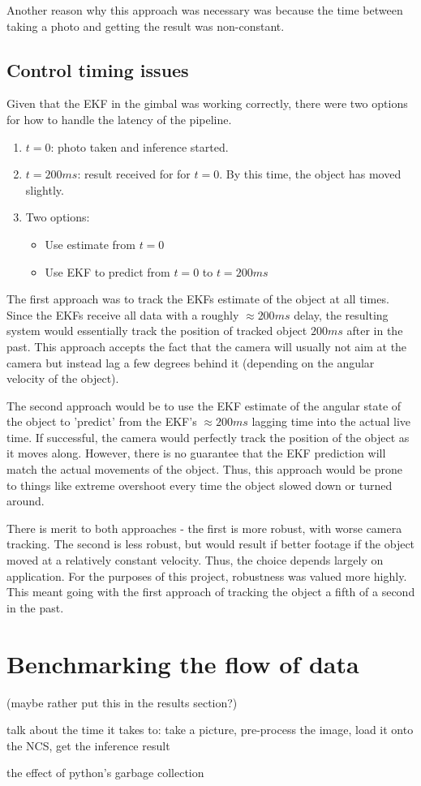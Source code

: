 Another reason why this approach was necessary was because the time between taking a photo and getting the result was non-constant.

\subsection{Control timing issues}
Given that the EKF in the gimbal was working correctly, there were two options for how to handle the latency of the pipeline.

\begin{enumerate}
\item $t = 0$: photo taken and inference started.
\item $t = 200ms$: result received for for $t=0$. By this time, the object has moved slightly.
\item Two options:
	\begin{itemize}
	\item Use estimate from $t=0$
	\item Use EKF to predict from $t=0$ to $t=200ms$
	\end{itemize}
\end{enumerate}

The first approach was to track the EKFs estimate of the object at all times. Since the EKFs receive all data with a roughly $\approx 200ms$ delay, the resulting system would essentially track the position of tracked object $200ms$ after in the past. This approach accepts the fact that the camera will usually not aim at the camera but instead lag a few degrees behind it (depending on the angular velocity of the object).

The second approach would be to use the EKF estimate of the angular state of the object to 'predict' from the EKF's $\approx 200ms$ lagging time into the actual live time. If successful, the camera would perfectly track the position of the object as it moves along. However, there is no guarantee that the EKF prediction will match the actual movements of the object. Thus, this approach would be prone to things like extreme overshoot every time the object slowed down or turned around.

There is merit to both approaches - the first is more robust, with worse camera tracking. The second is less robust, but would result if better footage if the object moved at a relatively constant velocity. Thus, the choice depends largely on application. For the purposes of this project, robustness was valued more highly. This meant going with the first approach of tracking the object a fifth of a second in the past.


\section{Benchmarking the flow of data}
{\Large \color{red} (maybe rather put this in the results section?)}

{\Large \color{red} talk about the time it takes to: take a picture, pre-process the image, load it onto the NCS, get the inference result}

{\Large \color{red} the effect of python's garbage collection}

